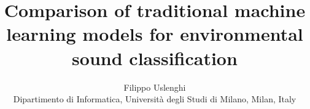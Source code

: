 \documentclass[journal]{IEEEtran}
\begin{document}
%
\title{Comparison of traditional machine learning models for environmental sound classification}
%
%
%

\author{{Filippo Uslenghi\\
Dipartimento di Informatica, Università degli Studi di Milano, Milan, Italy}
}

% 
%



% 
\end{document}
